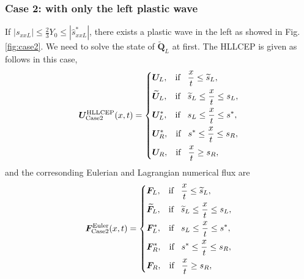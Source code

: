 \documentclass{article}
\numberwithin{equation}{section}
\numberwithin{table}{section}
\begin{document}
 \subsubsection{Case 2:  with only the left plastic wave}\label{sec:case2}
 If $|s_{xxL}| \le \frac{2}{3}Y_0 \le  |\hat{s}_{xxL}^*|$, there exists a plastic wave in the left as showed in Fig.\ref{fig:case2}. We need to solve the state  of $\widetilde{\bm{Q}}_L$ at first. The HLLCEP is given as follows in this case,
 \begin{equation}\label{eq:HLLCEP2}
   \bm{U}^{\text{HLLCEP}}_{\text{Case2}}(x,t) = \left\{ \begin{aligned}
	   & \bm{U}_L, \hspace{0.3cm} \text{if} \hspace{0.3cm} \frac{x}{t}\le \widetilde{s}_L, \\
		&  \widetilde{\bm{U}}_L, \hspace{0.3cm} \text{if} \hspace{0.3cm} \widetilde{s}_L\le \frac{x}{t} \le  s_L, \\
		&\bm{U}_L^*, \hspace{0.3cm} \text{if} \hspace{0.3cm} s_L\le \frac{x}{t} \le s^*, \\
		& \bm{U}_R^*, \hspace{0.3cm} \text{if} \hspace{0.3cm} s^*\le \frac{x}{t} \le s_R,\\
		& \bm{U}_R, \hspace{0.3cm} \text{if} \hspace{0.3cm} \frac{x}{t}\ge s_R, \\
	  \end{aligned}
	\right.
  \end{equation}
  and the corresonding Eulerian and Lagrangian numerical flux are 
 \begin{equation}\label{eq:HLLCEP}
   \bm{F}^{\text{Euler}}_{\text{Case2}}(x,t) = \left\{ \begin{aligned}
	   & \bm{F}_L, \hspace{0.3cm} \text{if} \hspace{0.3cm} \frac{x}{t}\le \widetilde{s}_L, \\
		&  \widetilde{\bm{F}}_L, \hspace{0.3cm} \text{if} \hspace{0.3cm} \widetilde{s}_L\le \frac{x}{t} \le   s_L , \\
		&\bm{F}_L^*, \hspace{0.3cm} \text{if} \hspace{0.3cm} s_L\le \frac{x}{t} \le s^*, \\
		& \bm{F}_R^*, \hspace{0.3cm} \text{if} \hspace{0.3cm} s^*\le \frac{x}{t} \le s_R,\\
		& \bm{F}_R, \hspace{0.3cm} \text{if} \hspace{0.3cm} \frac{x}{t}\ge s_R, \\
	  \end{aligned}
	\right.
  \end{equation}
\end{document}
